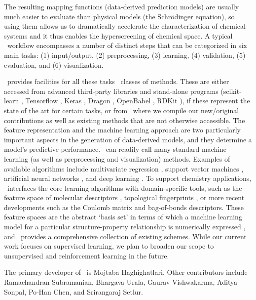 The resulting mapping functions (\ie  data-derived prediction models) are usually much easier to evaluate than physical models (\eg  the Schr\"odinger equation), so using them allows us to dramatically accelerate the characterization of chemical systems and it thus enables the hyperscreening of chemical space. 
A typical \chemml\ workflow encompasses a number of distinct steps that can be categorized in six main tasks: (1) input/output, (2) preprocessing, (3) learning, (4) validation, (5) evaluation, and (6) visualization. 

\chemml\ provides facilities for all these tasks \via\ classes of methods. These are either accessed from advanced third-party libraries and stand-alone programs (\eg  scikit-learn \cite{Pedregosa2011a}, Tensorflow \cite{tensorflow2015-whitepaper}, Keras \cite{chollet2015keras}, Dragon \cite{Taletesrl2011}, OpenBabel \cite{O'Boyle2011}, RDKit \cite{RDKit}), if these represent the state of the art for certain tasks, or from \chemmllib\ where we compile our new/original contributions as well as existing methods that are not otherwise accessible.  
The feature representation and the machine learning approach are two particularly important aspects in the generation of data-derived models, and they determine a model's predictive performance. 
\chemml\ can readily call many standard machine learning (as well as preprocessing and visualization) methods. Examples of available algorithms include multivariate regression \cite{ChristopherMBishop}, support vector machines \cite{Muller2001}, artificial neural networks \cite{Manzhos2006,Behler2007}, and deep learning \cite{dahl2015deep}. 
To support chemistry applications, \chemml\ interfaces the core learning algorithms with domain-specific tools, such as the feature space of molecular descriptors \cite{Todeschini2000,Sykora2008}, topological fingerprints \cite{Nilakantan1987,OBoyle2016c}, or more recent developments such as the Coulomb matrix \cite{Rupp2012} and bag-of-bonds \cite{Hansen2015b} descriptors. These feature spaces are the abstract `basis set' in terms of which a machine learning model for a particular structure-property relationship is numerically expressed \cite{Ramakrishnan2017}, and \chemml\ provides a comprehensive collection of existing schemes. While our current work focuses on supervised learning, we plan to broaden our scope to unsupervised and reinforcement learning in the future. 

The primary developer of \chemml\ is Mojtaba Haghighatlari. Other contributors include Ramachandran Subramanian, Bhargava Urala, Gaurav Vishwakarma, Aditya Sonpal, Po-Han Chen, and Srirangaraj Setlur.



